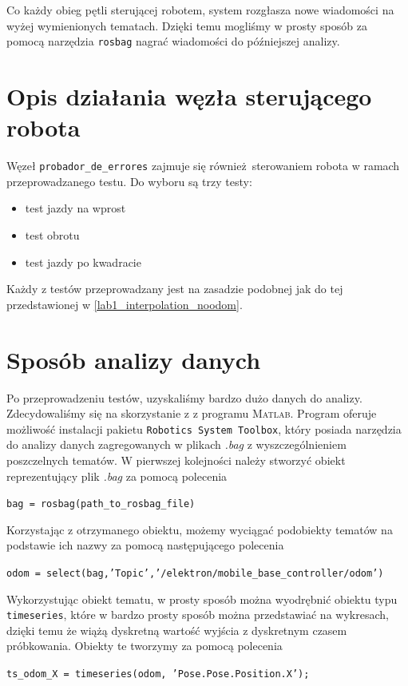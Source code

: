 \documentclass{mwrep}
\begin{document}
Co każdy obieg pętli sterującej robotem, system rozgłasza nowe wiadomości na wyżej wymienionych tematach.
Dzięki temu mogliśmy w prosty sposób za pomocą narzędzia \texttt{rosbag} nagrać wiadomości do późniejszej 
analizy.

\section{Opis działania węzła sterującego robota}
\label{pro1_controldescription}
Węzeł \texttt{probador\_{}de\_{}errores} zajmuje się również sterowaniem robota w ramach 
przeprowadzanego testu. Do wyboru są trzy testy: 

\begin{itemize}
	\item test jazdy na wprost
	\item test obrotu
	\item test jazdy po kwadracie\\
\end{itemize}

Każdy z testów przeprowadzany jest na zasadzie podobnej jak do tej przedstawionej w \ref{lab1_interpolation_noodom}.

\section{Sposób analizy danych}
\label{pro1_dataanalysis}
Po przeprowadzeniu testów, uzyskaliśmy bardzo dużo danych do analizy. Zdecydowaliśmy się na skorzystanie z 
z programu \textsc{Matlab}. Program oferuje możliwość instalacji pakietu \texttt{Robotics System Toolbox}, 
który posiada narzędzia do analizy danych zagregowanych w plikach \emph{.bag} z wyszczególnieniem poszczelnych 
tematów. W pierwszej kolejności należy stworzyć obiekt reprezentujący plik \emph{.bag} za pomocą polecenia 
\begin{center}
	\texttt{bag = rosbag(path\_{}to\_{}rosbag\_{}file)}
\end{center}

Korzystając z otrzymanego obiektu, możemy wyciągać podobiekty tematów na podstawie ich nazwy za pomocą następującego
polecenia
\begin{center}
	\mbox{\texttt{odom = select(bag,'Topic','/elektron/mobile\_{}base\_{}controller/odom')}}
\end{center}

Wykorzystując obiekt tematu, w prosty sposób można wyodrębnić obiektu typu \texttt{timeseries}, 
które w bardzo prosty sposób można przedstawiać na wykresach, dzięki temu że wiążą dyskretną wartość wyjścia
z dyskretnym czasem próbkowania. Obiekty te tworzymy za pomocą polecenia
\begin{center}
	\texttt{ts\_{}odom\_{}X = timeseries(odom, 'Pose.Pose.Position.X');}
\end{center}
\end{document}
